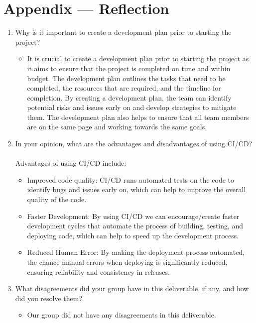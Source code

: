 \documentclass{article}
\begin{document}
\newpage{}

\section*{Appendix --- Reflection}



\begin{enumerate}
    \item Why is it important to create a development plan prior to starting the
    project?
    \begin{itemize}
        \item It is crucial to create a development plan prior to starting the project as it aims to ensure that the project is completed on time and within budget. The development plan outlines the tasks that need to be completed, the resources that are required, and the timeline for completion. By creating a development plan, the team can identify potential risks and issues early on and develop strategies to mitigate them. The development plan also helps to ensure that all team members are on the same page and working towards the same goals.
    \end{itemize}
    \item In your opinion, what are the advantages and disadvantages of using
    CI/CD? \\ \\
        Advantages of using CI/CD include:
        \begin{itemize}
        \item Improved code quality: CI/CD runs automated tests on the code to identify bugs and issues early on, which can help to improve the overall quality of the code.
        \item Faster Development: By using CI/CD we can encourage/create faster development cycles that automate the process of building, testing, and deploying code, which can help to speed up the development process.
        \item Reduced Human Error: By making the deployment process automated, the chance manual errors when deploying is significantly reduced, ensuring reliability and consistency in releases.
        \end{itemize}
    \item What disagreements did your group have in this deliverable, if any,
    and how did you resolve them?
    \begin{itemize}
        \item Our group did not have any disagreements in this deliverable.
    \end{itemize}
\end{enumerate}
\end{document}
